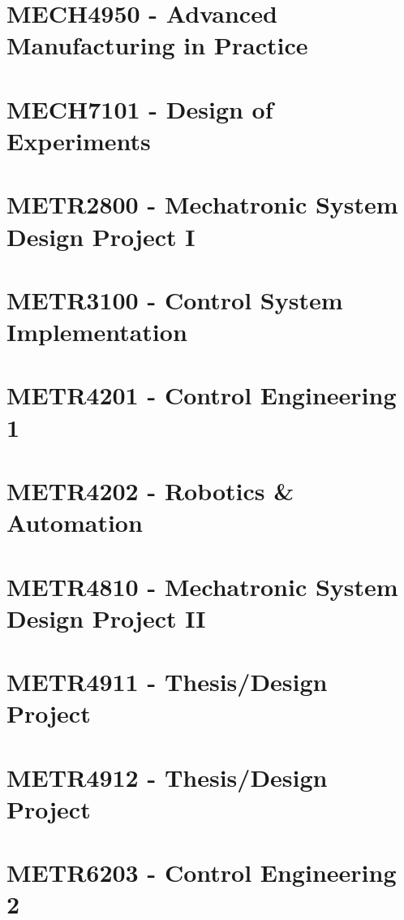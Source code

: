 \documentclass[a4paper,12pt]{report}
\begin{document}
\hypertarget{MECH4950}{\section{MECH4950 - Advanced Manufacturing in Practice}}

\hypertarget{MECH7101}{\section{MECH7101 - Design of Experiments}}

\hypertarget{METR2800}{\section{METR2800 - Mechatronic System Design Project I}}

\hypertarget{METR3100}{\section{METR3100 - Control System Implementation}}

\hypertarget{METR4201}{\section{METR4201 - Control Engineering 1}}

\hypertarget{METR4202}{\section{METR4202 - Robotics \& Automation}}

\hypertarget{METR4810}{\section{METR4810 - Mechatronic System Design Project II}}

\hypertarget{METR4911}{\section{METR4911 - Thesis/Design Project}}

\hypertarget{METR4912}{\section{METR4912 - Thesis/Design Project}}

\hypertarget{METR6203}{\section{METR6203 - Control Engineering 2}}
\end{document}
